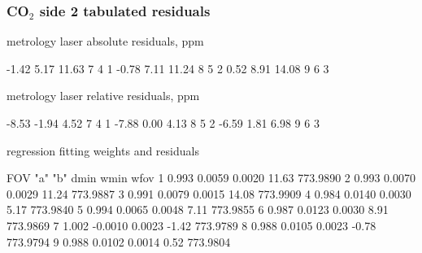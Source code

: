 \documentclass[9pt]{beamer}
\begin{document}
\begin{frame}[fragile]
\frametitle{CO$_2$ side 2 tabulated residuals}

  metrology laser absolute residuals, ppm
\begin{semiverbatim}\scriptsize
     -1.42     5.17    11.63         7   4   1
     -0.78     7.11    11.24         8   5   2
      0.52     8.91    14.08         9   6   3
\end{semiverbatim}

  metrology laser relative residuals, ppm
\begin{semiverbatim}\scriptsize
     -8.53    -1.94     4.52         7   4   1
     -7.88     0.00     4.13         8   5   2
     -6.59     1.81     6.98         9   6   3
\end{semiverbatim}

  regression fitting weights and residuals
\begin{semiverbatim}\scriptsize
 FOV   "a"       "b"     dmin     wmin      wfov
  1   0.993    0.0059   0.0020    11.63   773.9890 
  2   0.993    0.0070   0.0029    11.24   773.9887 
  3   0.991    0.0079   0.0015    14.08   773.9909 
  4   0.984    0.0140   0.0030     5.17   773.9840 
  5   0.994    0.0065   0.0048     7.11   773.9855 
  6   0.987    0.0123   0.0030     8.91   773.9869 
  7   1.002   -0.0010   0.0023    -1.42   773.9789 
  8   0.988    0.0105   0.0023    -0.78   773.9794 
  9   0.988    0.0102   0.0014     0.52   773.9804 
\end{semiverbatim}

\end{frame}
\end{document}
